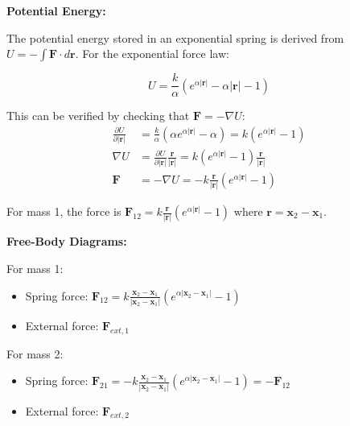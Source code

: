 \documentclass[11pt,a4paper]{article}
\begin{document}
\noindent \textbf{Potential Energy:}

\noindent The potential energy stored in an exponential spring is derived from $U = -\int \mathbf{F} \cdot d\mathbf{r}$. For the exponential force law:

\begin{equation}
U = \frac{k}{\alpha} \left( e^{\alpha |\mathbf{r}|} - \alpha |\mathbf{r}| - 1 \right)
\label{eq:exponential_potential}
\end{equation}

\noindent This can be verified by checking that $\mathbf{F} = -\nabla U$:
\begin{align}
\frac{\partial U}{\partial |\mathbf{r}|} &= \frac{k}{\alpha} \left( \alpha e^{\alpha |\mathbf{r}|} - \alpha \right) = k \left( e^{\alpha |\mathbf{r}|} - 1 \right) \\
\nabla U &= \frac{\partial U}{\partial |\mathbf{r}|} \frac{\mathbf{r}}{|\mathbf{r}|} = k \left( e^{\alpha |\mathbf{r}|} - 1 \right) \frac{\mathbf{r}}{|\mathbf{r}|} \\
\mathbf{F} &= -\nabla U = -k \frac{\mathbf{r}}{|\mathbf{r}|} \left( e^{\alpha |\mathbf{r}|} - 1 \right)
\end{align}

\noindent For mass 1, the force is $\mathbf{F}_{12} = k \frac{\mathbf{r}}{|\mathbf{r}|} (e^{\alpha |\mathbf{r}|} - 1)$ where $\mathbf{r} = \mathbf{x}_2 - \mathbf{x}_1$. \newline

\noindent \textbf{Free-Body Diagrams:}

\noindent For mass 1:
\begin{itemize}
    \item Spring force: $\mathbf{F}_{12} = k \frac{\mathbf{x}_2 - \mathbf{x}_1}{|\mathbf{x}_2 - \mathbf{x}_1|} \left( e^{\alpha |\mathbf{x}_2 - \mathbf{x}_1|} - 1 \right)$
    \item External force: $\mathbf{F}_{ext,1}$
\end{itemize}

\noindent For mass 2:
\begin{itemize}
    \item Spring force: $\mathbf{F}_{21} = -k \frac{\mathbf{x}_2 - \mathbf{x}_1}{|\mathbf{x}_2 - \mathbf{x}_1|} \left( e^{\alpha |\mathbf{x}_2 - \mathbf{x}_1|} - 1 \right) = -\mathbf{F}_{12}$
    \item External force: $\mathbf{F}_{ext,2}$ \newline
\end{itemize}
\end{document}
